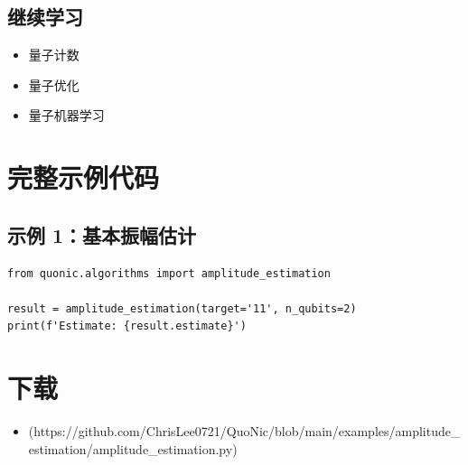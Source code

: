 \documentclass[12pt,a4paper]{article}
\begin{document}
\subsection{继续学习}
\begin{itemize}
  \item 量子计数
  \item 量子优化
  \item 量子机器学习
\end{itemize}

\section{完整示例代码}

\subsection{示例 1：基本振幅估计}

\begin{verbatim}
from quonic.algorithms import amplitude_estimation

result = amplitude_estimation(target='11', n_qubits=2)
print(f'Estimate: {result.estimate}')
\end{verbatim}

\section{下载}

\begin{itemize}
  \item [amplitude\_estimation.py](https://github.com/ChrisLee0721/QuoNic/blob/main/examples/amplitude_estimation/amplitude_estimation.py)
\end{itemize}
\end{document}
